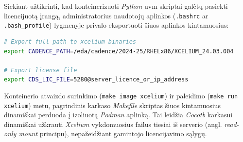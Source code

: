Siekiant užtikrinti, kad konteinerizuoti \textit{Python} \gls{uvm} skriptai galėtų pasiekti licencijuotą įrangą, administratorius naudotojų aplinkos (\texttt{.bashrc} ar \texttt{.bash\_profile}) lygmenyje privalo eksportuoti šiuos aplinkos kintamuosius:
\begin{lstlisting}[basicstyle=\ttfamily\footnotesize, language=bash]
# Export full path to xcelium binaries
export CADENCE_PATH=/eda/cadence/2024-25/RHELx86/XCELIUM_24.03.004

# Export license file
export CDS_LIC_FILE=5280@server_licence_or_ip_address
\end{lstlisting}
Konteinerio atvaizdo surinkimo (\texttt{make image xcelium}) ir paleidimo (\texttt{make run xcelium}) metu, pagrindinis karkaso \textit{Makefile} skriptas šiuos kintamuosius dinamiškai perduoda į izoliuotą \textit{Podman} aplinką. Tai leidžia \textit{Cocotb} karkasui dinamiškai užkrauti \textit{Xcelium} vykdomuosius failus tiesiai iš serverio (angl. \textit{read-only mount} principu), nepažeidžiant gamintojo licencijavimo sąlygų.